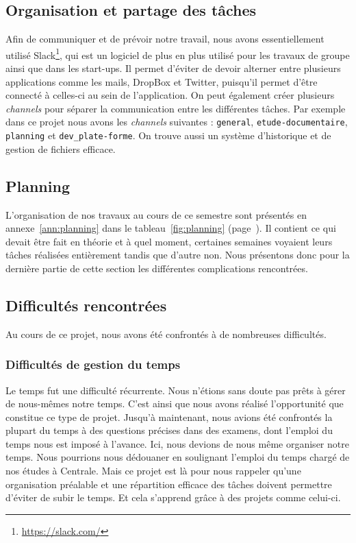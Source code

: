 \subsection{Organisation et partage des tâches}
Afin de communiquer et de prévoir notre travail, nous avons essentiellement utilisé Slack\footnote{\url{https://slack.com/}}, qui est un logiciel
de plus en plus utilisé pour les travaux de groupe ainsi que dans les start-ups.
Il permet d'éviter de devoir alterner entre plusieurs applications comme les mails,
DropBox et Twitter, puisqu'il permet d'être connecté
à celles-ci au sein de l'application.
On peut également créer plusieurs \emph{channels} pour séparer la communication
entre les différentes tâches.
Par exemple dans ce projet nous avons les \emph{channels} suivantes :
\texttt{general}, \texttt{etude-documentaire}, 
\texttt{planning} et \texttt{dev\_plate-forme}.
On trouve aussi un système d'historique et de gestion de fichiers efficace.

\subsection{Planning}
L'organisation de nos travaux au cours de ce semestre
sont présentés en annexe~\ref{ann:planning}
dans le tableau~\ref{fig:planning}
(page~\pageref{fig:planning}).
Il contient ce qui devait être fait en théorie et à quel moment,
certaines semaines voyaient leurs tâches réalisées entièrement
tandis que d'autre non.
Nous présentons donc pour la dernière partie de cette section
les différentes complications rencontrées.

\subsection{Difficultés rencontrées}

Au cours de ce projet, nous avons été confrontés à de nombreuses difficultés.

\subsubsection{Difficultés de gestion du temps}

Le temps fut une difficulté récurrente. Nous n'étions sans doute pas prêts à gérer de nous-mêmes notre temps. C'est ainsi que nous avons réalisé l'opportunité que constitue ce type de projet. 
Jusqu'à maintenant, nous avions été confrontés la plupart du temps à des questions précises dans des examens, dont l'emploi du temps nous est imposé à l'avance. 
Ici, nous devions de nous même organiser notre temps. 
Nous pourrions nous dédouaner en soulignant l'emploi du temps chargé de nos études à Centrale. 
Mais ce projet est là pour nous rappeler qu'une organisation préalable et une répartition efficace des tâches doivent permettre d'éviter de subir le temps. Et cela s'apprend grâce à des projets comme celui-ci.

